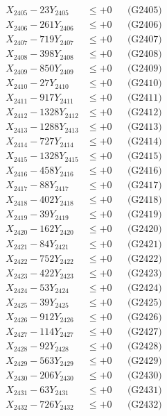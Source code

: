 \documentclass[a4paper,10pt]{article}
\begin{document}
{\begin{align}
X_{2405} - 23Y_{2405} &\leq +0 && \text{(G2405)} \\
X_{2406} - 261Y_{2406} &\leq +0 && \text{(G2406)} \\
X_{2407} - 719Y_{2407} &\leq +0 && \text{(G2407)} \\
X_{2408} - 398Y_{2408} &\leq +0 && \text{(G2408)} \\
X_{2409} - 850Y_{2409} &\leq +0 && \text{(G2409)} \\
X_{2410} - 27Y_{2410} &\leq +0 && \text{(G2410)} \\
\allowbreak
X_{2411} - 917Y_{2411} &\leq +0 && \text{(G2411)} \\
X_{2412} - 1328Y_{2412} &\leq +0 && \text{(G2412)} \\
X_{2413} - 1288Y_{2413} &\leq +0 && \text{(G2413)} \\
X_{2414} - 727Y_{2414} &\leq +0 && \text{(G2414)} \\
X_{2415} - 1328Y_{2415} &\leq +0 && \text{(G2415)} \\
X_{2416} - 458Y_{2416} &\leq +0 && \text{(G2416)} \\
X_{2417} - 88Y_{2417} &\leq +0 && \text{(G2417)} \\
X_{2418} - 402Y_{2418} &\leq +0 && \text{(G2418)} \\
X_{2419} - 39Y_{2419} &\leq +0 && \text{(G2419)} \\
X_{2420} - 162Y_{2420} &\leq +0 && \text{(G2420)} \\
\allowbreak
X_{2421} - 84Y_{2421} &\leq +0 && \text{(G2421)} \\
X_{2422} - 752Y_{2422} &\leq +0 && \text{(G2422)} \\
X_{2423} - 422Y_{2423} &\leq +0 && \text{(G2423)} \\
X_{2424} - 53Y_{2424} &\leq +0 && \text{(G2424)} \\
X_{2425} - 39Y_{2425} &\leq +0 && \text{(G2425)} \\
X_{2426} - 912Y_{2426} &\leq +0 && \text{(G2426)} \\
X_{2427} - 114Y_{2427} &\leq +0 && \text{(G2427)} \\
X_{2428} - 92Y_{2428} &\leq +0 && \text{(G2428)} \\
X_{2429} - 563Y_{2429} &\leq +0 && \text{(G2429)} \\
X_{2430} - 206Y_{2430} &\leq +0 && \text{(G2430)} \\
\allowbreak
X_{2431} - 63Y_{2431} &\leq +0 && \text{(G2431)} \\
X_{2432} - 726Y_{2432} &\leq +0 && \text{(G2432)} \\

\end{align}}
\end{document}
